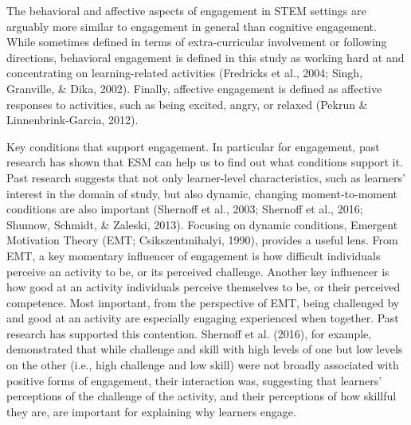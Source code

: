 \documentclass[]{book}
\theoremstyle{definition}
\theoremstyle{definition}
\theoremstyle{definition}
\theoremstyle{remark}
\begin{document}
The behavioral and affective aspects of engagement in STEM settings are
arguably more similar to engagement in general than cognitive
engagement. While sometimes defined in terms of extra-curricular
involvement or following directions, behavioral engagement is defined in
this study as working hard at and concentrating on learning-related
activities (Fredricks et al., 2004; Singh, Granville, \& Dika, 2002).
Finally, affective engagement is defined as affective responses to
activities, such as being excited, angry, or relaxed (Pekrun \&
Linnenbrink-Garcia, 2012).

Key conditions that support engagement. In particular for engagement,
past research has shown that ESM can help us to find out what conditions
support it. Past research suggests that not only learner-level
characteristics, such as learners' interest in the domain of study, but
also dynamic, changing moment-to-moment conditions are also important
(Shernoff et al., 2003; Shernoff et al., 2016; Shumow, Schmidt, \&
Zaleski, 2013). Focusing on dynamic conditions, Emergent Motivation
Theory (EMT; Csikszentmihalyi, 1990), provides a useful lens. From EMT,
a key momentary influencer of engagement is how difficult individuals
perceive an activity to be, or its perceived challenge. Another key
influencer is how good at an activity individuals perceive themselves to
be, or their perceived competence. Most important, from the perspective
of EMT, being challenged by and good at an activity are especially
engaging experienced when together. Past research has supported this
contention. Shernoff et al. (2016), for example, demonstrated that while
challenge and skill with high levels of one but low levels on the other
(i.e., high challenge and low skill) were not broadly associated with
positive forms of engagement, their interaction was, suggesting that
learners' perceptions of the challenge of the activity, and their
perceptions of how skillful they are, are important for explaining why
learners engage.
\end{document}
